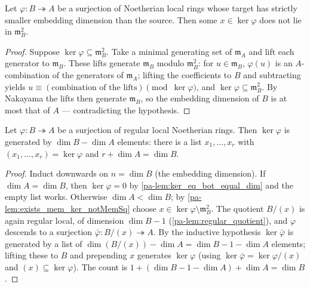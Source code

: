 \begin{lemma}
  \label{pa-lem:exists_mem_ker_notMemSq}
  \leanok

  Let \(\varphi : B \twoheadrightarrow A\) be a surjection of Noetherian local
  rings whose target has strictly smaller embedding dimension than the source.
  Then some \(x \in \ker\varphi\) does not lie in \(\mathfrak m_B^2\).
\end{lemma}
\begin{proof}
  \leanok
  Suppose \(\ker\varphi \subseteq \mathfrak m_B^2\). Take a minimal generating
  set of \(\mathfrak m_A\) and lift each generator to \(\mathfrak m_B\). These
  lifts generate \(\mathfrak m_B\) modulo \(\mathfrak m_B^2\): for
  \(u \in \mathfrak m_B\), \(\varphi(u)\) is an \(A\)-combination of the
  generators of \(\mathfrak m_A\); lifting the coefficients to \(B\) and
  subtracting yields \(u \equiv (\text{combination of the lifts}) \pmod{\ker\varphi}\),
  and \(\ker\varphi \subseteq \mathfrak m_B^2\). By Nakayama the lifts then
  generate \(\mathfrak m_B\), so the embedding dimension of \(B\) is at most that
  of \(A\) --- contradicting the hypothesis.
\end{proof}

\begin{theorem}
  \label{pa-thm:ker_gen_regular_local}
  \leanok

  Let \(\varphi : B \twoheadrightarrow A\) be a surjection of regular local
  Noetherian rings. Then \(\ker\varphi\) is generated by \(\dim B - \dim A\)
  elements: there is a list \(x_1, \dots, x_r\) with \((x_1, \dots, x_r) =
  \ker\varphi\) and \(r + \dim A = \dim B\).
\end{theorem}
\begin{proof}
  \leanok
  Induct downwards on \(n = \dim B\) (the embedding dimension). If
  \(\dim A = \dim B\), then \(\ker\varphi = 0\) by \ref{pa-lem:ker_eq_bot_equal_dim}
  and the empty list works. Otherwise \(\dim A < \dim B\); by
  \ref{pa-lem:exists_mem_ker_notMemSq} choose \(x \in \ker\varphi \setminus
  \mathfrak m_B^2\). The quotient \(B/(x)\) is again regular local, of dimension
  \(\dim B - 1\) (\ref{pa-lem:regular_quotient}), and \(\varphi\) descends to a
  surjection \(\bar\varphi : B/(x) \twoheadrightarrow A\). By the inductive
  hypothesis \(\ker\bar\varphi\) is generated by a list of
  \(\dim(B/(x)) - \dim A = \dim B - 1 - \dim A\) elements; lifting these to \(B\)
  and prepending \(x\) generates \(\ker\varphi\) (using
  \(\ker\bar\varphi = \ker\varphi/(x)\) and \((x) \subseteq \ker\varphi\)). The
  count is \(1 + (\dim B - 1 - \dim A) + \dim A = \dim B\).
\end{proof}

